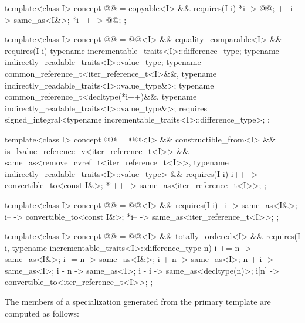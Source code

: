 \begin{codeblock}
template<class I>
concept @@ =
  copyable<I> && requires(I i) {
    {   *i } -> @@;
    {  ++i } -> same_as<I&>;
    { *i++ } -> @@;
  };

template<class I>
concept @@ =
  @@<I> && equality_comparable<I> && requires(I i) {
    typename incrementable_traits<I>::difference_type;
    typename indirectly_readable_traits<I>::value_type;
    typename common_reference_t<iter_reference_t<I>&&,
                                typename indirectly_readable_traits<I>::value_type&>;
    typename common_reference_t<decltype(*i++)&&,
                                typename indirectly_readable_traits<I>::value_type&>;
    requires signed_integral<typename incrementable_traits<I>::difference_type>;
  };

template<class I>
concept @@ =
  @@<I> && constructible_from<I> &&
  is_lvalue_reference_v<iter_reference_t<I>> &&
  same_as<remove_cvref_t<iter_reference_t<I>>,
          typename indirectly_readable_traits<I>::value_type> &&
  requires(I i) {
    {  i++ } -> convertible_to<const I&>;
    { *i++ } -> same_as<iter_reference_t<I>>;
  };

template<class I>
concept @@ =
  @@<I> && requires(I i) {
    {  --i } -> same_as<I&>;
    {  i-- } -> convertible_to<const I&>;
    { *i-- } -> same_as<iter_reference_t<I>>;
  };

template<class I>
concept @@ =
  @@<I> && totally_ordered<I> &&
  requires(I i, typename incrementable_traits<I>::difference_type n) {
    { i += n } -> same_as<I&>;
    { i -= n } -> same_as<I&>;
    { i +  n } -> same_as<I>;
    { n +  i } -> same_as<I>;
    { i -  n } -> same_as<I>;
    { i -  i } -> same_as<decltype(n)>;
    {  i[n]  } -> convertible_to<iter_reference_t<I>>;
  };
\end{codeblock}

\pnum
The members of a specialization  generated from the
 primary template are computed as follows:

